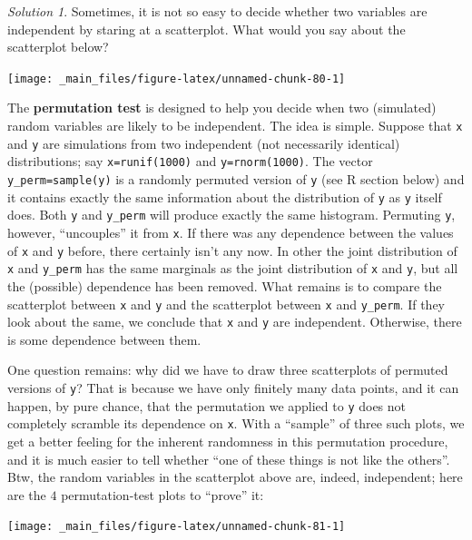 \documentclass[
]{book}
\theoremstyle{definition}
\theoremstyle{definition}
\theoremstyle{definition}
\theoremstyle{definition}
\theoremstyle{remark}
\newtheorem*{solution}{Solution}
\begin{document}
\begin{solution}
Sometimes, it is not so easy to decide whether two variables are independent by staring at a scatterplot. What would you say about the scatterplot below?

\begin{center}\texttt{[image: \_main\_files/figure-latex/unnamed-chunk-80-1]} \end{center}

The \textbf{permutation test} is designed to help you decide when two (simulated)
random variables are likely to be independent. The idea is simple. Suppose that
\texttt{x} and \texttt{y} are simulations from two independent (not necessarily identical)
distributions; say \texttt{x=runif(1000)} and \texttt{y=rnorm(1000)}. The vector
\texttt{y\_perm=sample(y)} is a randomly permuted version of \texttt{y} (see R section below)
and it contains exactly the same information about the distribution of \texttt{y} as
\texttt{y} itself does. Both \texttt{y} and \texttt{y\_perm} will produce exactly the same histogram.
Permuting \texttt{y}, however, ``uncouples'' it from \texttt{x}. If there was any dependence
between the values of \texttt{x} and \texttt{y} before, there certainly isn't any now. In
other the joint distribution of \texttt{x} and \texttt{y\_perm} has the same marginals as the
joint distribution of \texttt{x} and \texttt{y}, but all the (possible) dependence has been
removed. What remains is to compare the scatterplot between \texttt{x} and \texttt{y} and the
scatterplot between \texttt{x} and \texttt{y\_perm}. If they look about the same, we conclude
that \texttt{x} and \texttt{y} are independent. Otherwise, there is some dependence between
them.

One question remains: why did we have to draw three scatterplots of permuted
versions of \texttt{y}? That is because we have only finitely many data points, and it
can happen, by pure chance, that the permutation we applied to \texttt{y} does not
completely scramble its dependence on \texttt{x}. With a ``sample'' of three such plots,
we
get a better feeling for the inherent randomness in this permutation procedure,
and it is much easier to tell whether ``one of these things is not like the
others''. Btw, the random variables in the scatterplot above are, indeed,
independent; here are the \(4\) permutation-test plots to ``prove'' it:

\begin{center}\texttt{[image: \_main\_files/figure-latex/unnamed-chunk-81-1]} \end{center}


\end{solution}
\end{document}
